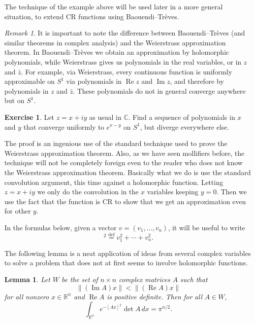 \documentclass[12pt,openany]{book}
\renewcommand{\Re}{\operatorname{Re}}
\renewcommand{\Im}{\operatorname{Im}}
\newcommand{\snorm}[1]{\lVert {#1} \rVert}
\newcommand{\C}{{\mathbb{C}}}
\newcommand{\R}{{\mathbb{R}}}
\theoremstyle{plain}
\newtheorem{lemma}[thm]{Lemma}
\theoremstyle{remark}
\newtheorem{remark}[thm]{Remark}
\theoremstyle{definition}
\newenvironment{exbox}{%
    \def\FrameCommand{\vrule width 1pt \relax\hspace{10pt}}%
    \MakeFramed{\advance\hsize-\width\FrameRestore}%
}{%
    \endMakeFramed
}
\theoremstyle{exercise}
\newtheorem{exercise}{Exercise}[section]
\theoremstyle{example}
\begin{document}
The technique of the example above will be used later in a more general
situation, to extend CR functions using Baouendi--Tr{\`e}ves.

\begin{remark}
It is important to note the difference
between Baouendi--Tr{\`e}ves (and similar theorems
in complex analysis)
and the Weierstrass approximation theorem.  In Baouendi--Tr{\`e}ves we obtain
an approximation by holomorphic polynomials, while Weierstrass gives us
polynomials in the real variables, or in $z$ and $\bar{z}$.  For example,
via Weierstrass, every continuous function is uniformly approximable on $S^1$ via polynomials
in $\Re z$ and $\Im z$, and therefore by polynomials in $z$ and $\bar{z}$.
These polynomials do not in general converge anywhere but on $S^1$.
\end{remark}

\begin{exbox}
\begin{exercise}
Let $z=x+iy$ as usual in $\C$.
Find a sequence of polynomials in $x$ and $y$ that converge uniformly to $e^{x-y}$ on $S^1$,
but diverge everywhere else.
\end{exercise}
\end{exbox}


The proof is an ingenious
use of the standard technique used to prove the Weierstrass approximation
theorem.  Also, as we have seen mollifiers before, the technique will not be
completely foreign even to the reader who does not know the Weierstrass
approximation theorem.  Basically what we do is use the standard convolution
argument, this time against a holomorphic function.  Letting $z=x+iy$
we only do the convolution in the
$x$ variables keeping $y=0$.  Then we use the fact that the
function is CR to show that we get an approximation even for other $y$.

In the formulas below, given a vector $v = (v_1,\ldots,v_n)$,
it will be useful to write
%
\begin{equation*}
[v]^2 \overset{\text{def}}{=} v_1^2 + \cdots + v_n^2 .
\end{equation*}

The following lemma is a neat application of ideas from several complex
variables to solve a problem that does not at first seems to involve
holomorphic functions.

\begin{lemma} \label{lemma:matrixint}
Let $W$ be the set of $n \times n$ complex matrices $A$ such that
\begin{equation*}
\snorm{(\Im A)x} < \snorm{(\Re A)x}
\end{equation*}
for all nonzero $x \in \R^n$ and $\Re A$ is positive definite.
Then for all $A \in W$,
\begin{equation*}
\int_{\R^n} e^{-{[Ax]}^2} \det A \, dx  = \pi^{n/2} .
\end{equation*}
\end{lemma}
\end{document}
